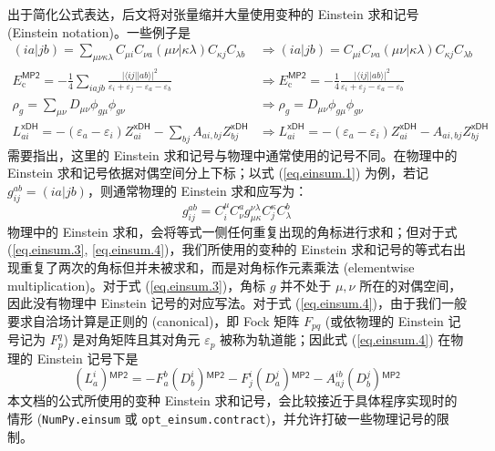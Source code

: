 出于简化公式表达，后文将对张量缩并大量使用变种的 Einstein 求和记号 (Einstein notation)。一些例子是
\begin{align}
  \label{eq.einsum.1}
  (ia|jb) = \sum_{\mu \nu \kappa \lambda} C_{\mu i} C_{\nu a} (\mu \nu | \kappa \lambda) C_{\kappa j} C_{\lambda b}
  &\Rightarrow 
  (ia|jb) = C_{\mu i} C_{\nu a} (\mu \nu | \kappa \lambda) C_{\kappa j} C_{\lambda b} \\
  \label{eq.einsum.2}
  E_\mathrm{c}^\textsf{MP2} = - \frac{1}{4} \sum_{iajb} \frac{\big| \langle i j || a b \rangle \big|^2}{\varepsilon_i + \varepsilon_j - \varepsilon_a - \varepsilon_b}
  &\Rightarrow
  E_\mathrm{c}^\textsf{MP2} = - \frac{1}{4} \frac{\big| \langle i j || a b \rangle \big|^2}{\varepsilon_i + \varepsilon_j - \varepsilon_a - \varepsilon_b} \\
  \label{eq.einsum.3}
  \rho_g = \sum_{\mu \nu} D_{\mu \nu} \phi_{g \mu} \phi_{g \nu}
  &\Rightarrow
  \rho_g = D_{\mu \nu} \phi_{g \mu} \phi_{g \nu} \\
  \label{eq.einsum.4}
  L_{ai}^\textsf{xDH} = - (\varepsilon_a - \varepsilon_i) Z_{ai}^\textsf{xDH} - \sum_{bj} A_{ai, bj} Z_{bj}^\textsf{xDH}
  &\Rightarrow
  L_{ai}^\textsf{xDH} = - (\varepsilon_a - \varepsilon_i) Z_{ai}^\textsf{xDH} - A_{ai, bj} Z_{bj}^\textsf{xDH}
\end{align}
需要指出，这里的 Einstein 求和记号与物理中通常使用的记号不同\cite{Einstein-Einstein.AP.1916}。在物理中的 Einstein 求和记号依据对偶空间分上下标；以式 (\ref{eq.einsum.1}) 为例，若记 $g_{ij}^{ab} = (ia|jb)$，则通常物理的 Einstein 求和应写为：
\begin{equation*}
  g_{ij}^{ab} = C^\mu_i C^a_\nu g^{\nu \lambda}_{\mu \kappa} C^\kappa_j C^b_\lambda
\end{equation*}
物理中的 Einstein 求和，会将等式一侧任何重复出现的角标进行求和；但对于式 (\ref{eq.einsum.3}, \ref{eq.einsum.4})，我们所使用的变种的 Einstein 求和记号的等式右出现重复了两次的角标但并未被求和，而是对角标作元素乘法 (elementwise multiplication)。对于式 (\ref{eq.einsum.3})，角标 $g$ 并不处于 $\mu, \nu$ 所在的对偶空间，因此没有物理中 Einstein 记号的对应写法。对于式 (\ref{eq.einsum.4})，由于我们一般要求自洽场计算是正则的 (canonical)，即 Fock 矩阵 $F_{pq}$ (或依物理的 Einstein 记号记为 $F_p^q$) 是对角矩阵且其对角元 $\varepsilon_p$ 被称为轨道能；因此式 (\ref{eq.einsum.4}) 在物理的 Einstein 记号下是
\begin{equation*}
  (L_a^i){}^\textsf{MP2} = - F_a^b (D_b^i){}^\textsf{MP2} - F_j^i (D_a^j){}^\textsf{MP2} - A_{aj}^{ib} (D_b^j){}^\textsf{MP2}
\end{equation*}
本文档的公式所使用的变种 Einstein 求和记号，会比较接近于具体程序实现时的情形 (\verb|NumPy.einsum| 或 \verb|opt_einsum.contract|)，并允许打破一些物理记号的限制。

